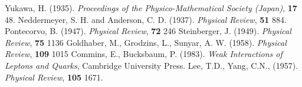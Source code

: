 \documentclass[12pt]{book}
\begin{document}
\begin{thebibliography}{widest-label}
      Yukawa, H. (1935). \emph{Proceedings of the Physico-Mathematical Society (Japan)}, \textbf{17} 48.
      Neddermeyer, S. H. and Anderson, C. D. (1937). \emph{Physical Review}, \textbf{51} 884.
      Pontecorvo, B. (1947). \emph{Physical Review}, \textbf{72} 246
      Steinberger, J. (1949). \emph{Physical Review}, \textbf{75} 1136
      Goldhaber, M., Grodzins, L., Sunyar, A. W. (1958). \emph{Physical Review}, \textbf{109} 1015
      Commins, E., Bucksbaum, P. (1983). \emph{Weak Interactions of Leptons and Quarks}, Cambridge University Press.
      Lee, T.D., Yang, C.N., (1957). \emph{Physical Review}, \textbf{105} 1671.
\end{thebibliography}
\end{document}
